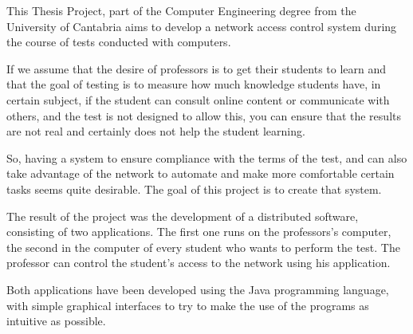 This Thesis Project, part of the Computer Engineering degree from the University of Cantabria aims to develop a network access control system during the course of tests conducted with computers.
\newline

If we assume that the desire of professors is to get their students to learn and that the goal of testing is to measure how much knowledge students have, in certain subject, if the student can consult online content or communicate with others, and the test is not designed to allow this, you can ensure that the results are not real and certainly does not help the student learning.
\newline

So, having a system to ensure compliance with the terms of the test, and can also take advantage of the network to automate and make more comfortable certain tasks seems quite desirable. The goal of this project is to create that system.
\newline


The result of the project was the development of a distributed software, consisting of two applications. The first one runs on the professors's computer, the second in the computer of every student who wants to perform the test. The professor can control the student's access to the network using his application.
\newline


Both applications have been developed using the Java programming language, with simple graphical interfaces to try to make the use of the programs as intuitive as possible.
